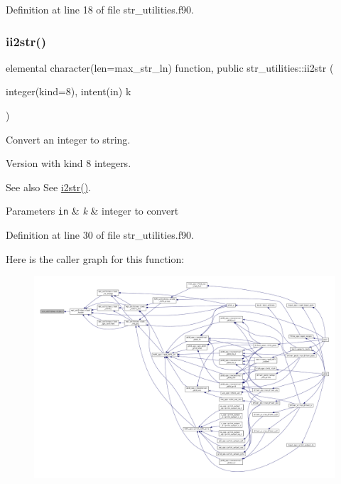 Definition at line 18 of file str\+\_\+utilities.\+f90.

\mbox{\label{namespacestr__utilities_acb8c4e66aead51f178e47fdea8d7a7db}} 
\subsubsection{\texorpdfstring{ii2str()}{ii2str()}}
{\footnotesize\ttfamily elemental character(len=max\+\_\+str\+\_\+ln) function, public str\+\_\+utilities\+::ii2str (\begin{DoxyParamCaption}\item[{integer(kind=8), intent(in)}]{k }\end{DoxyParamCaption})}



Convert an integer to string. 

Version with kind 8 integers.

\begin{DoxySeeAlso}{See also}
See \hyperlink{namespacestr__utilities_a0b97e51770725a3e98ed393d26681414}{i2str()}.
\end{DoxySeeAlso}

\begin{DoxyParams}[1]{Parameters}
\mbox{\tt in}  & {\em k} & integer to convert \\
\hline
\end{DoxyParams}


Definition at line 30 of file str\+\_\+utilities.\+f90.

Here is the caller graph for this function\+:\nopagebreak
\begin{figure}[H]
\begin{center}
\leavevmode
\includegraphics[width=350pt]{namespacestr__utilities_acb8c4e66aead51f178e47fdea8d7a7db_icgraph}
\end{center}
\end{figure}
\mbox{\label{namespacestr__utilities_a6ab16f33c155db79844279c6a56a494c}} 

